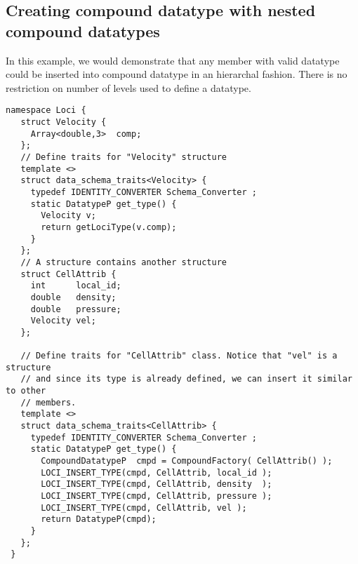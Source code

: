 \subsection{Creating compound datatype with nested compound
datatypes}
In this example, we would demonstrate that any member with valid
datatype could be inserted into compound datatype in an hierarchal fashion. There
is no restriction on number of levels used to define a datatype.
\begin{verbatim}
namespace Loci {
   struct Velocity {
     Array<double,3>  comp;
   };
   // Define traits for "Velocity" structure
   template <>
   struct data_schema_traits<Velocity> {
     typedef IDENTITY_CONVERTER Schema_Converter ;
     static DatatypeP get_type() {
       Velocity v;
       return getLociType(v.comp);
     }
   };
   // A structure contains another structure
   struct CellAttrib {
     int      local_id;
     double   density;
     double   pressure;
     Velocity vel;
   };
 
   // Define traits for "CellAttrib" class. Notice that "vel" is a structure
   // and since its type is already defined, we can insert it similar to other
   // members.
   template <>
   struct data_schema_traits<CellAttrib> {
     typedef IDENTITY_CONVERTER Schema_Converter ;
     static DatatypeP get_type() {
       CompoundDatatypeP  cmpd = CompoundFactory( CellAttrib() );
       LOCI_INSERT_TYPE(cmpd, CellAttrib, local_id );
       LOCI_INSERT_TYPE(cmpd, CellAttrib, density  );
       LOCI_INSERT_TYPE(cmpd, CellAttrib, pressure );
       LOCI_INSERT_TYPE(cmpd, CellAttrib, vel );
       return DatatypeP(cmpd);
     }
   };
 }
\end{verbatim}

